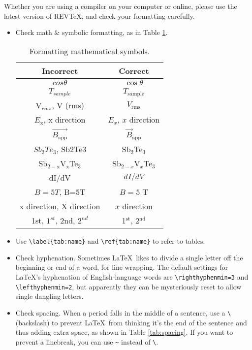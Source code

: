 \documentclass[aps,prb,twocolumn,superscriptaddress,floatfix,longbibliography]{revtex4-2}
\newif\ifptitle
\newif\ifpnumber
\newcounter{para}
\newcommand\ptitle[1]{\par\refstepcounter{para}
{\ifpnumber{\noindent\textcolor{lightgray}{\textbf{\thepara}}\indent}\fi}
{\ifptitle{\textbf{[{#1}]}}\fi}}
\begin{document}
\ptitle{Formatting checklist} Whether you are using a compiler on your computer or online, please use the latest version of REVTeX, and check your formatting carefully.
\begin{itemize}[label=$\Box$]
\item Check math \& symbolic formatting, as in Table \ref{tab:mathformat}.
\begin{table}[h!]
  \begin{center}
    \caption{Formatting mathematical symbols.}
    \label{tab:mathformat}
    \begin{tabular}{c|c} %
      \hline
      \textbf{Incorrect} & \textbf{Correct} \\
      \hline \hline
      $cos \theta$ & $\cos \theta$ \\
      $T_{sample}$ & $T_\mathrm{sample}$ \\
      V$_{rms}$, V (rms) & $V_\mathrm{rms}$ \\
      $E_\mathrm{x}$, x direction & $E_x$, $x$ direction \\
      $\vec{B_\mathrm{app}}$ & $\vec{B}_\mathrm{app}$ \\
      $Sb_2Te_3$, Sb2Te3 & Sb$_2$Te$_3$ \\
      Sb$_{2-\mathrm{x}}$V$_\mathrm{x}$Te$_3$ & Sb$_{2-x}$V$_x$Te$_3$ \\
      dI/dV & $dI/dV$ \\
      $B = 5 T$, B=5T & $B=5$ T \\
      x direction, X direction & $x$ direction \\
      1st, $1^{st}$, 2nd, $2^{nd}$ & 1$^\mathrm{st}$, 2$^{\mathrm{nd}}$ \\
      \hline
    \end{tabular}
  \end{center}
\end{table}
\item Use {\tt \textbackslash label\{tab:name\}} and {\tt \textbackslash ref\{tab:name\}} to refer to tables.
\item Check hyphenation. Sometimes \LaTeX\ likes to divide a single letter off the beginning or end of a word, for line wrapping. The default settings for \LaTeX's hyphenation of English-language words are {\tt \textbackslash righthyphenmin=3} and {\tt \textbackslash lefthyphenmin=2}, but apparently they can be mysteriously reset to allow single dangling letters.
\item Check spacing. When a period falls in the middle of a sentence, use a {\tt \textbackslash} (backslash) to prevent \LaTeX\ from thinking it's the end of the sentence and thus adding extra space, as shown in Table \ref{tab:spacing}. If you want to prevent a linebreak, you can use {\tt \textasciitilde} instead of {\tt \textbackslash}.

\end{itemize}
\end{document}
